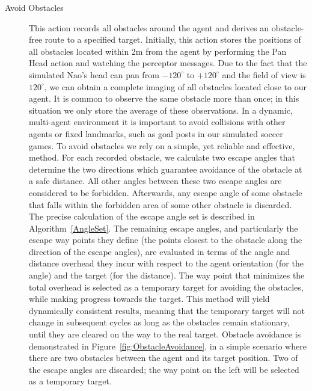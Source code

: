 \begin{description}




 \item[Avoid Obstacles] This action records all obstacles around the agent and derives an obstacle-free route to a specified target. Initially, this action stores the positions of all obstacles located within 2m from the agent by performing the Pan Head action and watching the perceptor messages. Due to the fact that the simulated Nao's head can pan from $-120^{\circ}$ to $+120^{\circ}$ and the field of view is $120^{\circ}$, we can obtain a complete imaging of all obstacles located close to our agent. It is common to observe the same obstacle more than once; in this situation we only store the average of these observations. In a dynamic, multi-agent environment it is important to avoid collisions with other agents or fixed landmarks, such as goal posts in our simulated soccer games. To avoid obstacles we rely on a simple, yet reliable and effective, method. For each recorded obstacle, we calculate two escape angles that determine the two directions which guarantee avoidance of the obstacle at a safe distance. All other angles between these two escape angles are considered to be forbidden. Afterwards, any escape angle of some obstacle that falls within the forbidden area of some other obstacle is discarded.  The precise calculation of the escape angle set is described in Algorithm~\ref{AngleSet}. The remaining escape angles, and particularly the escape way points they define (the points closest to the obstacle along the direction of the escape angles), are evaluated in terms of the angle and distance overhead they incur with respect to the agent orientation (for the angle) and the target (for the distance). The way point that minimizes the total overhead is selected as a temporary target for avoiding the obstacles, while making progress towards the target. This method will yield dynamically consistent results, meaning that the temporary target will not change in subsequent cycles as long as the obstacles remain stationary, until they are cleared on the way to the real target. Obstacle avoidance is demonstrated in Figure~\ref{fig:ObstacleAvoidance}, in a simple scenario where there are two obstacles between the agent and its target position. Two of the escape angles are discarded; the way point on the left will be selected as a temporary target. 
 






\end{description}
